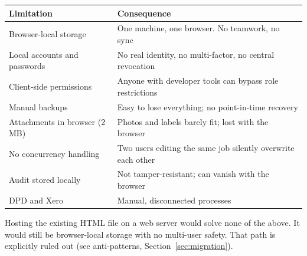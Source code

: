 \begin{tabularx}{\textwidth}{@{}l X@{}}
\toprule
Limitation & Consequence \\
\midrule
Browser-local storage & One machine, one browser. No teamwork, no sync \\
Local accounts and passwords & No real identity, no multi-factor, no central revocation \\
Client-side permissions & Anyone with developer tools can bypass role restrictions \\
Manual backups & Easy to lose everything; no point-in-time recovery \\
Attachments in browser (2 MB) & Photos and labels barely fit; lost with the browser \\
No concurrency handling & Two users editing the same job silently overwrite each other \\
Audit stored locally & Not tamper-resistant; can vanish with the browser \\
DPD and Xero & Manual, disconnected processes \\
\bottomrule
\end{tabularx}

\begin{warningbox}
Hosting the existing HTML file on a web server would solve none of the above. It would
still be browser-local storage with no multi-user safety. That path is explicitly ruled
out (see anti-patterns, Section~\ref{sec:migration}).
\end{warningbox}
